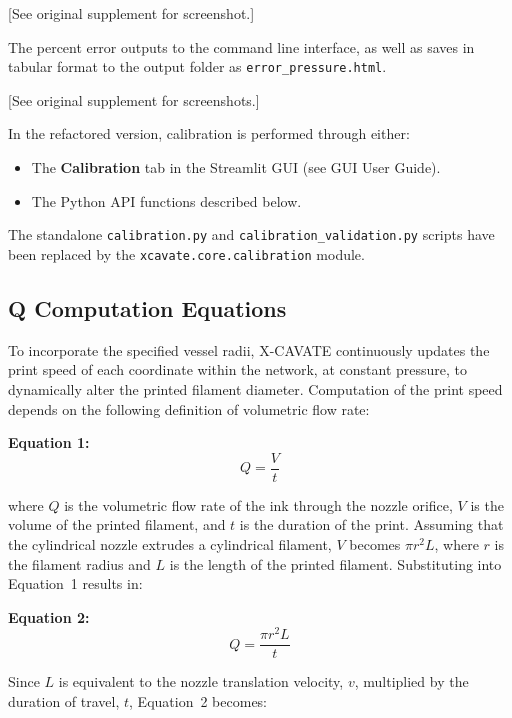 \documentclass[11pt,letterpaper]{article}
\newcommand{\code}[1]{\texttt{#1}}
\newcommand{\gui}[1]{\textcolor{guicolor}{\textsf{\textbf{#1}}}}
\begin{document}
[See original supplement for screenshot.]

The percent error outputs to the command line interface, as well as saves in
tabular format to the output folder as \code{error\_pressure.html}.

[See original supplement for screenshots.]

\begin{claudebox}
In the refactored version, calibration is performed through either:
\begin{itemize}[nosep]
    \item The \gui{Calibration} tab in the Streamlit GUI (see GUI User Guide).
    \item The Python API functions described below.
\end{itemize}
The standalone \code{calibration.py} and \code{calibration\_validation.py}
scripts have been replaced by the \code{xcavate.core.calibration} module.
\end{claudebox}

\subsection{Q Computation Equations}

To incorporate the specified vessel radii, X-CAVATE continuously updates the
print speed of each coordinate within the network, at constant pressure, to
dynamically alter the printed filament diameter. Computation of the print
speed depends on the following definition of volumetric flow rate:

\textbf{Equation 1:}
\begin{equation}
Q = \frac{V}{t}
\end{equation}

where $Q$ is the volumetric flow rate of the ink through the nozzle orifice,
$V$ is the volume of the printed filament, and $t$ is the duration of the
print. Assuming that the cylindrical nozzle extrudes a cylindrical filament,
$V$ becomes $\pi r^2 L$, where $r$ is the filament radius and $L$ is the
length of the printed filament. Substituting into Equation~1 results in:

\textbf{Equation 2:}
\begin{equation}
Q = \frac{\pi r^2 L}{t}
\end{equation}

Since $L$ is equivalent to the nozzle translation velocity, $v$, multiplied
by the duration of travel, $t$, Equation~2 becomes:
\end{document}
